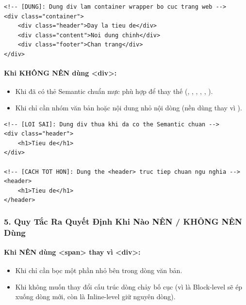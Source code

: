 \begin{codeWindow}
\begin{lstlisting}[language=HTML5]
<!-- [DUNG]: Dung div lam container wrapper bo cuc trang web -->
<div class="container">
    <div class="header">Day la tieu de</div>
    <div class="content">Noi dung chinh</div>
    <div class="footer">Chan trang</div>
</div>
\end{lstlisting}
\end{codeWindow}

\paragraph{Khi KHÔNG NÊN dùng <div>:}
\begin{itemize}[leftmargin=1.8em, itemsep=3pt, parsep=0pt]
    \item Khi đã có thẻ Semantic chuẩn mực phù hợp để thay thế (, , , , , ).
    \item Khi chỉ cần nhóm văn bản hoặc nội dung nhỏ nội dòng (nền dùng  thay vì ).
\end{itemize}

\begin{codeWindow}
\begin{lstlisting}[language=HTML5]
<!-- [LOI SAI]: Dung div thua khi da co the Semantic chuan -->
<div class="header">
    <h1>Tieu de</h1>
</div>

<!-- [CACH TOT HON]: Dung the <header> truc tiep chuan ngu nghia -->
<header>
    <h1>Tieu de</h1>
</header>
\end{lstlisting}
\end{codeWindow}

\subsubsection{5. Quy Tắc Ra Quyết Định Khi Nào NÊN / KHÔNG NÊN Dùng }

\paragraph{Khi NÊN dùng <span> thay vì <div>:}
\begin{itemize}[leftmargin=1.8em, itemsep=3pt, parsep=0pt]
    \item Khi chỉ cần bọc một phần nhỏ bên trong dòng văn bản.
    \item Khi không muốn thay đổi cấu trúc dòng chảy bố cục (vì  là Block-level sẽ ép xuống dòng mới, còn  là Inline-level giữ nguyên dòng).
\end{itemize}

